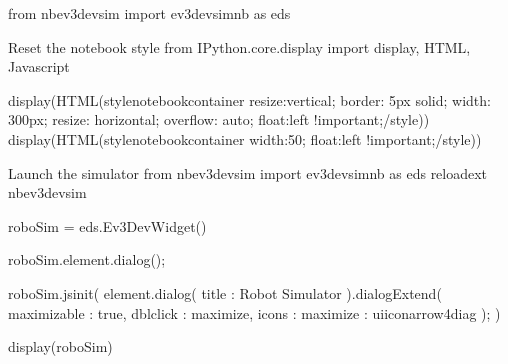 \documentclass[letterpaper,10pt,english]{sphinxmanual}
\begin{document}
{
\begin{sphinxVerbatim}[commandchars=\\\{\}]
\llap{\color{nbsphinxin}[ ]:\,\hspace{\fboxrule}\hspace{\fboxsep}}from nbev3devsim import ev3devsim\PYGZus{}nb as eds

\PYGZsh{}Reset the notebook style
from IPython.core.display import display, HTML, Javascript

\PYGZsh{}display(HTML(\PYGZdq{}\PYGZlt{}style\PYGZgt{}\PYGZsh{}notebook\PYGZhy{}container \PYGZob{} resize:vertical; border: 5px solid;  width: 300px; resize: horizontal; overflow: auto; float:left !important;\PYGZcb{}\PYGZlt{}/style\PYGZgt{}\PYGZdq{}))
display(HTML(\PYGZdq{}\PYGZlt{}style\PYGZgt{}\PYGZsh{}notebook\PYGZhy{}container \PYGZob{} width:50\PYGZpc{}; float:left !important;\PYGZcb{}\PYGZlt{}/style\PYGZgt{}\PYGZdq{}))

\PYGZsh{}Launch the simulator
from nbev3devsim import ev3devsim\PYGZus{}nb as eds
\PYGZpc{}reload\PYGZus{}ext nbev3devsim

roboSim = eds.Ev3DevWidget()

roboSim.element.dialog();


roboSim.js\PYGZus{}init(\PYGZdq{}\PYGZdq{}\PYGZdq{}
element.dialog(\PYGZob{} \PYGZdq{}title\PYGZdq{} : \PYGZdq{}Robot Simulator\PYGZdq{} \PYGZcb{}).dialogExtend(\PYGZob{}
        \PYGZdq{}maximizable\PYGZdq{} : true,
        \PYGZdq{}dblclick\PYGZdq{} : \PYGZdq{}maximize\PYGZdq{},
        \PYGZdq{}icons\PYGZdq{} : \PYGZob{} \PYGZdq{}maximize\PYGZdq{} : \PYGZdq{}ui\PYGZhy{}icon\PYGZhy{}arrow\PYGZhy{}4\PYGZhy{}diag\PYGZdq{} \PYGZcb{}\PYGZcb{});
\PYGZdq{}\PYGZdq{}\PYGZdq{})

display(roboSim)
\end{sphinxVerbatim}
}

{
\begin{sphinxVerbatim}[commandchars=\\\{\}]
\llap{\color{nbsphinxin}[ ]:\,\hspace{\fboxrule}\hspace{\fboxsep}}
   
\end{sphinxVerbatim}
}
\end{document}

